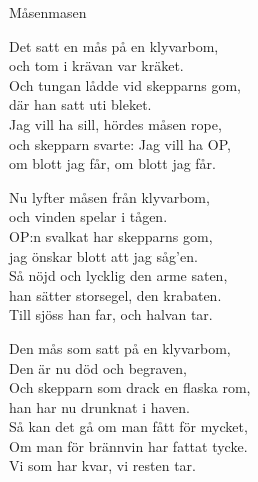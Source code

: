 \begin{song}{Måsen}{masen}
\begin{vers}
Det satt en mås på en klyvarbom,\\
och tom i krävan var kräket.\\
Och tungan lådde vid skepparns gom,\\
där han satt uti bleket.\\
Jag vill ha sill, hördes måsen rope,\\
och skepparn svarte: Jag vill ha OP,\\
om blott jag får, om blott jag får.\\
\end{vers}

\begin{vers}
Nu lyfter måsen från klyvarbom,\\
och vinden spelar i tågen.\\
OP:n svalkat har skepparns gom,\\
jag önskar blott att jag såg'en.\\
Så nöjd och lycklig den arme saten,\\
han sätter storsegel, den krabaten.\\
Till sjöss han far, och halvan tar.\\
\end{vers}

\begin{vers}
Den mås som satt på en klyvarbom,\\
Den är nu död och begraven,\\
Och skepparn som drack en flaska rom,\\
han har nu drunknat i haven.\\
Så kan det gå om man fått för mycket,\\
Om man för brännvin har fattat tycke.\\
Vi som har kvar, vi resten tar.\\
\end{vers}
\end{song}
